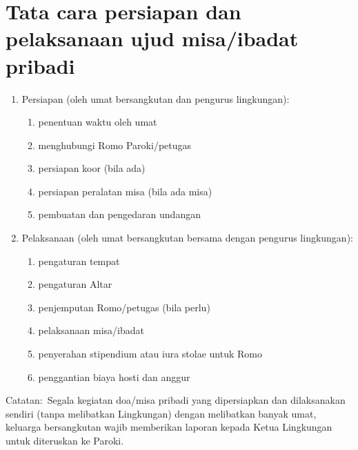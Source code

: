 \section{Tata cara persiapan dan pelaksanaan ujud  misa/ibadat pribadi}
\label{sec:tataCara}
\begin{enumerate}
\item Persiapan (oleh umat bersangkutan dan pengurus lingkungan):

\begin{enumerate}
\item penentuan waktu oleh umat
\item menghubungi Romo Paroki/petugas
\item persiapan koor (bila ada)
\item persiapan peralatan misa (bila ada misa)
\item pembuatan dan pengedaran undangan
\end{enumerate}
\item Pelaksanaan (oleh umat bersangkutan bersama dengan pengurus
lingkungan):

\begin{enumerate}
\item pengaturan tempat
\item pengaturan Altar
\item penjemputan Romo/petugas (bila perlu)
\item pelaksanaan misa/ibadat
\item penyerahan stipendium atau iura stolae untuk Romo
\item penggantian biaya hosti dan anggur
\end{enumerate}
\end{enumerate}
Catatan:~Segala kegiatan doa/misa pribadi yang dipersiapkan dan
dilaksanakan sendiri (tanpa melibatkan Lingkungan) dengan melibatkan
banyak umat, keluarga bersangkutan wajib memberikan laporan kepada
Ketua Lingkungan untuk diteruskan ke Paroki.
